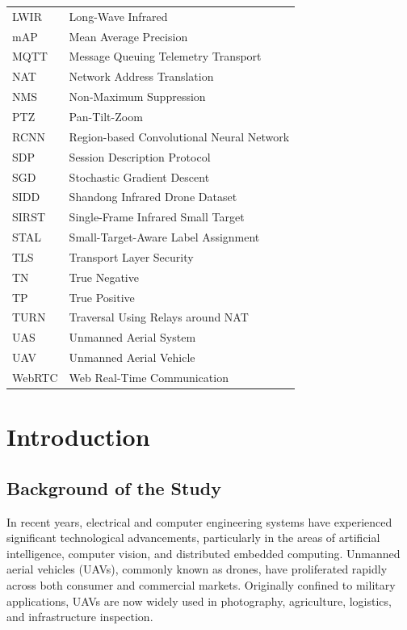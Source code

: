 \documentclass[12pt,a4paper]{report}
\makeatletter
\def\cleardoublepage{\clearpage\if@twoside\ifodd\c@page\else
  \hbox{}\thispagestyle{empty}\newpage\fi\fi}
\makeatother
\begin{document}
\begin{longtable}{@{}p{3.2cm}@{}p{11cm}@{}}
LWIR      & Long-Wave Infrared \\
mAP       & Mean Average Precision \\
MQTT      & Message Queuing Telemetry Transport \\
NAT       & Network Address Translation \\
NMS       & Non-Maximum Suppression \\
PTZ       & Pan-Tilt-Zoom \\
RCNN      & Region-based Convolutional Neural Network \\
SDP       & Session Description Protocol \\
SGD       & Stochastic Gradient Descent \\
SIDD      & Shandong Infrared Drone Dataset \\
SIRST     & Single-Frame Infrared Small Target \\
STAL      & Small-Target-Aware Label Assignment \\
TLS       & Transport Layer Security \\
TN        & True Negative \\
TP        & True Positive \\
TURN      & Traversal Using Relays around NAT \\
UAS       & Unmanned Aerial System \\
UAV       & Unmanned Aerial Vehicle \\
WebRTC    & Web Real-Time Communication \\
\end{longtable}

\cleardoublepage
{}
\setcounter{page}{1}

\chapter{Introduction}

\section{Background of the Study}

In recent years, electrical and computer engineering systems have experienced
significant technological advancements, particularly in the areas of artificial
intelligence, computer vision, and distributed embedded computing. Unmanned
aerial vehicles (UAVs), commonly known as drones, have proliferated rapidly
across both consumer and commercial markets. Originally confined to military
applications, UAVs are now widely used in photography, agriculture, logistics,
and infrastructure inspection.
\end{document}
